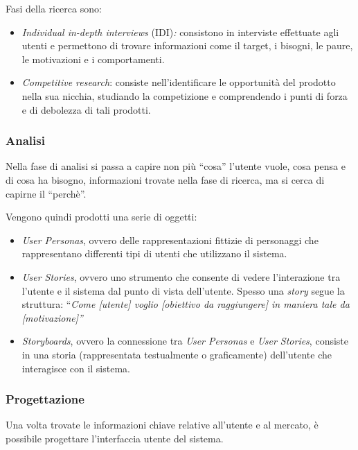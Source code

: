 Fasi della ricerca sono:

\begin{itemize}
    \item \emph{Individual in-depth interviews} (IDI)\emph{:} consistono in interviste effettuate agli utenti e permettono di trovare informazioni come il target, i bisogni, le paure, le motivazioni e i comportamenti.
    \item \emph{Competitive research}: consiste nell'identificare le opportunità del prodotto nella sua nicchia, studiando la competizione e comprendendo i punti di forza e di debolezza di tali prodotti.
\end{itemize}
\hypertarget{analisi}{%
\subsubsection{Analisi}\label{analisi}}

Nella fase di analisi si passa a capire non più ``cosa'' l'utente vuole, cosa pensa e di cosa ha bisogno, informazioni trovate nella fase di ricerca, ma si cerca di capirne il ``perchè''.

Vengono quindi prodotti una serie di oggetti:

\begin{itemize}
    \item \emph{User Personas}, ovvero delle rappresentazioni fittizie di personaggi che rappresentano differenti tipi di utenti che utilizzano il sistema.
    \item \emph{User Stories}, ovvero uno strumento che consente di vedere l'interazione tra l'utente e il sistema dal punto di vista dell'utente. Spesso una \emph{story} segue la struttura: ``\emph{Come {[}utente{]} voglio {[}obiettivo da raggiungere{]} in maniera tale da {[}motivazione{]}''}
    \item \emph{Storyboards}, ovvero la connessione tra \emph{User Personas} e \emph{User Stories}, consiste in una storia (rappresentata testualmente o graficamente) dell'utente che interagisce con il sistema.
\end{itemize}
\hypertarget{progettazione}{%
\subsubsection{Progettazione}\label{progettazione}}

Una volta trovate le informazioni chiave relative all'utente e al mercato, è possibile progettare l'interfaccia utente del sistema.

